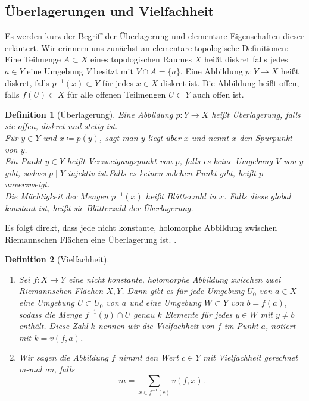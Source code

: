 \documentclass[11pt,a4paper,toc=bibliography]{scrartcl}
\theoremstyle{thm}
\theoremstyle{def}
\newtheorem{defi}{Definition}[section]
\theoremstyle{remark}
\begin{document}
\subsection{Überlagerungen und Vielfachheit}
Es werden kurz der Begriff der Überlagerung und elementare Eigenschaften dieser erläutert. Wir erinnern uns zunächst an elementare topologische Definitionen:\\
Eine Teilmenge $A\subset X$ eines topologischen Raumes $X$ heißt diskret falls jedes $a\in Y$ eine Umgebung $V$ besitzt mit $V\cap A= \{a\}$. Eine Abbildung $p:Y\rightarrow X$ heißt diskret, falls $p^{-1}(x)\subset Y$  für jedes $x\in X$ diskret ist. Die Abbildung heißt offen, falls $f(U)\subset X$ für alle offenen Teilmengen $U\subset Y$ auch offen ist.
\begin{defi}[Überlagerung]
Eine Abbildung $p:Y\rightarrow X$ heißt \emph{Überlagerung}, falls sie offen, diskret und stetig ist.\\
Für $y\in Y$ und $x\coloneqq p(y)$, sagt man \emph{$y$ liegt über $x$} und nennt $x$ den \emph{Spurpunkt} von $y$.\\
Ein Punkt $y\in Y$ heißt \emph{Verzweigungspunkt} von $p$, falls es keine Umgebung $V$ von $y$ gibt, sodass $p\mid Y$ injektiv ist.Falls es keinen solchen Punkt gibt, heißt $p$ \emph{unverzweigt}.\\
Die Mächtigkeit der Mengen $p^{-1}(x)$ heißt \emph{Blätterzahl in $x$}. Falls diese global konstant ist, heißt sie \emph{Blätterzahl} der Überlagerung.
\end{defi}
Es folgt direkt, dass jede nicht konstante, holomorphe Abbildung zwischen Riemannschen Flächen eine Überlagerung ist. \cite[S.18]{forster}.
\begin{defi}[Vielfachheit]
\begin{enumerate}
    \item
    Sei $f:X\rightarrow Y$ eine nicht konstante, holomorphe Abbildung zwischen zwei Riemannschen Flächen $X,Y$. Dann gibt es für jede Umgebung $U_0$ von $a\in X$ eine Umgebung $U\subset U_0$ von $a$ und eine Umgebung $W\subset Y$ von $b=f(a)$, sodass die Menge $f^{-1}(y)\cap U$ genau $k$ Elemente für jedes $y\in W$ mit $y\neq b$ enthält. Diese Zahl $k$ nennen wir die \emph{Vielfachheit} von $f$ im Punkt $a$, notiert mit $k=v(f,a)$.
    \item
    Wir sagen die Abbildung $f$ nimmt den Wert $c\in Y$ \emph{mit Vielfachheit gerechnet m-mal} an, falls
    \[
    m =\sum_{x\in f^{-1}(c)} v(f,x).
    \]
    \end{enumerate}
\end{defi}
\end{document}
